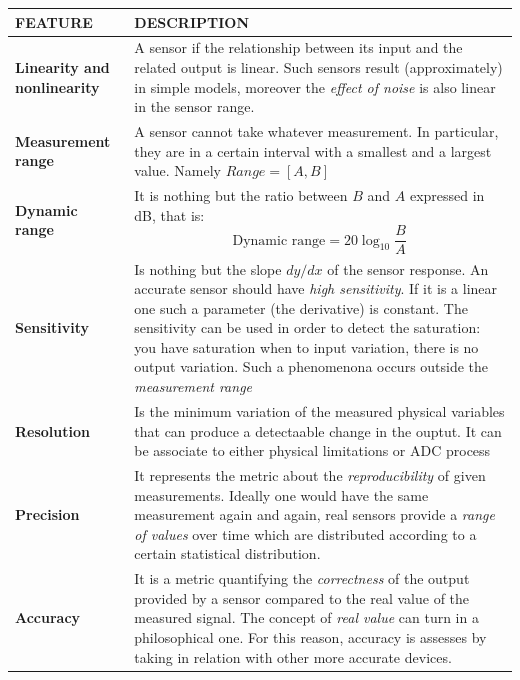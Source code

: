 \begin{table}
    \centering
    \small
    \begin{tabular}{p{5.5cm} p{9.5cm}}
        \toprule
        \textbf{FEATURE}&{\textbf{DESCRIPTION}}\\
        \midrule\midrule
        \textbf{Linearity and nonlinearity}&{A sensor if the relationship between its input and the related output is linear. Such sensors result (approximately) in simple models, moreover the \textit{effect of noise} is also linear in the sensor range.
        }\\
        \midrule
        \textbf{Measurement range}&{A sensor cannot take whatever measurement. In particular, they are in a certain interval with a smallest and a largest value. Namely $Range=[A,B]$}\\
        \midrule
        \textbf{Dynamic range}&{It is nothing but the ratio between $B$ and $A$ expressed in dB, that is:
        \begin{equation*}
            \text{Dynamic range}=20\log_{10} \frac{B}{A}
        \end{equation*}}\\
        \midrule
        \textbf{Sensitivity}&{Is nothing but the slope $dy/dx$ of the sensor response. An accurate sensor should have \textit{high sensitivity}. If it is a linear one such a parameter (the derivative) is constant. The sensitivity can be used in order to detect the saturation: you have saturation when to input variation, there is no output variation. Such a phenomenona occurs outside the \textit{measurement range}}\\
        \midrule
        \textbf{Resolution}&{Is the minimum variation of the measured physical variables that can produce a detectaable change in the ouptut. It can be associate to either physical limitations or ADC process}\\
        \midrule
        \textbf{Precision}&{It represents the metric about the \textit{reproducibility} of given measurements. Ideally one would have the same measurement again and again, real sensors provide a \textit{range of values} over time which are distributed according to a certain statistical distribution.}\\
        \midrule
        \textbf{Accuracy}&{It is a metric quantifying the \textit{correctness} of the output provided by a sensor compared to the real value of the measured signal. The concept of \textit{real value} can turn in a philosophical one. For this reason, accuracy is assesses by taking in relation with other more accurate devices.}\\

\end{tabular}
\end{table}
